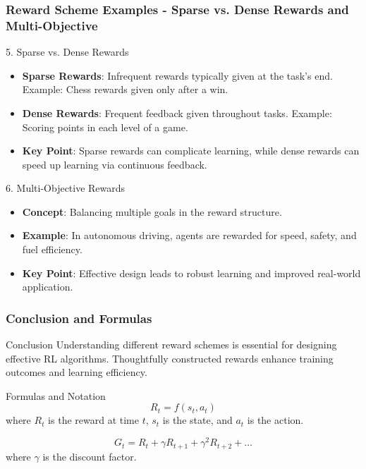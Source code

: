 \documentclass[aspectratio=169]{beamer}
\begin{document}
\begin{frame}[fragile]
    \frametitle{Reward Scheme Examples - Sparse vs. Dense Rewards and Multi-Objective}
    \begin{block}{5. Sparse vs. Dense Rewards}
        \begin{itemize}
            \item \textbf{Sparse Rewards}: Infrequent rewards typically given at the task's end. Example: Chess rewards given only after a win.
            \item \textbf{Dense Rewards}: Frequent feedback given throughout tasks. Example: Scoring points in each level of a game.
            \item \textbf{Key Point}: Sparse rewards can complicate learning, while dense rewards can speed up learning via continuous feedback.
        \end{itemize}
    \end{block}
    
    \begin{block}{6. Multi-Objective Rewards}
        \begin{itemize}
            \item \textbf{Concept}: Balancing multiple goals in the reward structure.
            \item \textbf{Example}: In autonomous driving, agents are rewarded for speed, safety, and fuel efficiency.
            \item \textbf{Key Point}: Effective design leads to robust learning and improved real-world application.
        \end{itemize}
    \end{block}
\end{frame}

\begin{frame}[fragile]
    \frametitle{Conclusion and Formulas}
    \begin{block}{Conclusion}
        Understanding different reward schemes is essential for designing effective RL algorithms. Thoughtfully constructed rewards enhance training outcomes and learning efficiency.
    \end{block}

    \begin{block}{Formulas and Notation}
        \begin{equation}
            R_t = f(s_t, a_t)
        \end{equation}
        where \( R_t \) is the reward at time \( t \), \( s_t \) is the state, and \( a_t \) is the action.

        \begin{equation}
            G_t = R_t + \gamma R_{t+1} + \gamma^2 R_{t+2} + \ldots
        \end{equation}
        where \( \gamma \) is the discount factor.
    \end{block}
\end{frame}
\end{document}
